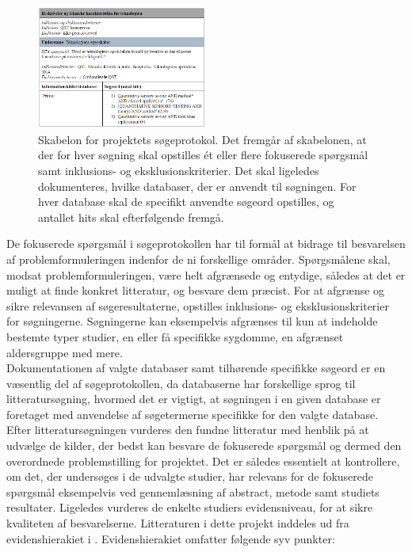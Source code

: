 \begin{figure}[H] 
\begin{center}
\includegraphics[width=0.5\textwidth]{figures/cMetode/soegeprotokol}
\end{center}
\caption{Skabelon for projektets søgeprotokol. Det fremgår af skabelonen, at der for hver søgning skal opstilles ét eller flere fokuserede spørgsmål samt inklusions- og eksklusionskriterier. Det skal ligeledes dokumenteres, hvilke databaser, der er anvendt til søgningen. For hver database skal de specifikt anvendte søgeord opstilles, og antallet hits skal efterfølgende fremgå.} 
\label{fig:soegeprotokol} 
\end{figure}

De fokuserede spørgsmål i søgeprotokollen har til formål at bidrage til besvarelsen af problemformuleringen indenfor de ni forskellige områder. Spørgsmålene skal, modsat problemformuleringen, være helt afgrænsede og entydige, således at det er muligt at finde konkret litteratur, og besvare dem præcist. \citep{metodehaandbogen}  
For at afgrænse og sikre relevansen af søgeresultaterne, opstilles inklusions- og eksklusionskriterier for søgningerne. Søgningerne kan eksempelvis afgrænses til kun at indeholde bestemte typer studier, en eller få specifikke sygdomme, en afgrænset aldersgruppe med mere. \citep{metodehaandbogen}\\
Dokumentationen af valgte databaser samt tilhørende specifikke søgeord er en væsentlig del af søgeprotokollen, da databaserne har forskellige sprog til litteratursøgning, hvormed det er vigtigt, at søgningen i en given database er foretaget med anvendelse af søgetermerne specifikke for den valgte database. \citep{metodehaandbogen}
Efter litteratursøgningen vurderes den fundne litteratur med henblik på at udvælge de kilder, der bedst kan besvare de fokuserede spørgsmål og dermed den overordnede problemstilling for projektet. Det er således essentielt at kontrollere, om det, der undersøges i de udvalgte studier, har relevans for de fokuserede spørgsmål eksempelvis ved gennemlæsning af abstract, metode samt studiets resultater. Ligeledes vurderes de enkelte studiers evidensniveau, for at sikre kvaliteten af besvarelserne. \citep{metodehaandbogen} 
Litteraturen i dette projekt inddeles ud fra evidenshierakiet i \cite{metodehaandbogen}. Evidenshierakiet omfatter følgende syv punkter: 

